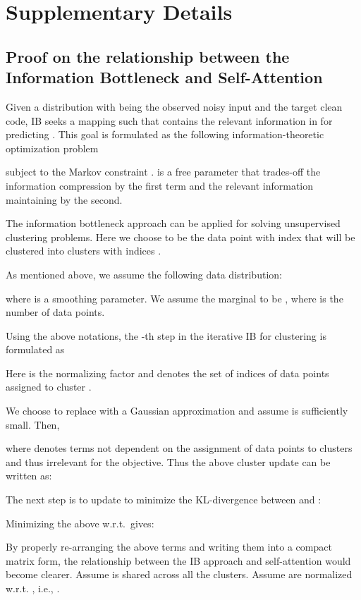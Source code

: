 \documentclass[nohyperref]{article}
\theoremstyle{plain}
\theoremstyle{definition}
\theoremstyle{remark}
\begin{document}
\newpage
\appendix
\onecolumn
\section{Supplementary Details}
\subsection{Proof on the relationship between the Information Bottleneck  and Self-Attention }
Given a  distribution  with  being the observed noisy input and  the target clean code, IB seeks a mapping  such that  contains the relevant information in  for predicting .  This goal is formulated as the following information-theoretic optimization problem

subject to the Markov constraint .  is a free parameter that trades-off the information compression by the first term and the relevant information maintaining by the second. 

The information bottleneck approach can be applied for solving unsupervised clustering problems.  Here we choose  to be the data point with index  that will  be clustered into clusters with  indices . 


As mentioned above, we assume the following data distribution:

where  is a smoothing parameter. We assume the marginal to be , where  is the number of data points. 

Using the above notations, the -th step in the iterative IB for clustering is formulated as

Here  is the normalizing factor and  denotes the set of indices of data points assigned to cluster . 


We choose to replace  with a Gaussian approximation  and assume  is sufficiently small. Then,

where  denotes terms not dependent on the assignment of data points to clusters and thus irrelevant for the objective. Thus the above cluster update can be written as:


The next step is to update  to minimize the KL-divergence between  and :

Minimizing the above w.r.t.\  gives:


By properly re-arranging the above terms and writing them into a compact matrix form,  the relationship between the IB approach and self-attention would become clearer. Assume  is shared across all the clusters. Assume        are   normalized w.r.t. , i.e., . 
\end{document}
